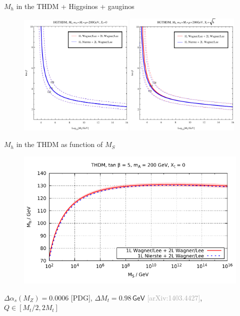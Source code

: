 \documentclass[hyperref={pdfpagelabels=false},ngerman]{beamer}
\newcommand{\eh}[1]{\,\mathsf{#1}}
\newcommand{\bigcite}[1]{\textcolor{darkgray}{[#1]}}
\begin{document}
\begin{frame}{$M_h$ in the THDM + Higgsinos + gauginos}
  \begin{figure}
    \centering
    \includegraphics[width=0.49\textwidth]{plots/THDM/HGTHDMIIMSSMBC_Xt-0_combined}
    \includegraphics[width=0.49\textwidth]{plots/THDM/HGTHDMIIMSSMBC_Xt-Sqrt[6]_combined}
  \end{figure}
\end{frame}

\begin{frame}{$M_h$ in the THDM as function of $M_S$}
  \begin{figure}
    \centering
    \includegraphics[width=\textwidth]{plots/THDM/scale_THDM_Xt-0}
  \end{figure}
  $\Delta \alpha_s(M_Z) = 0.0006$ [PDG], $\Delta M_t = 0.98 \eh{GeV}$
  \bigcite{arXiv:1403.4427}, $Q\in [M_t/2,2M_t]$
\end{frame}
\end{document}
